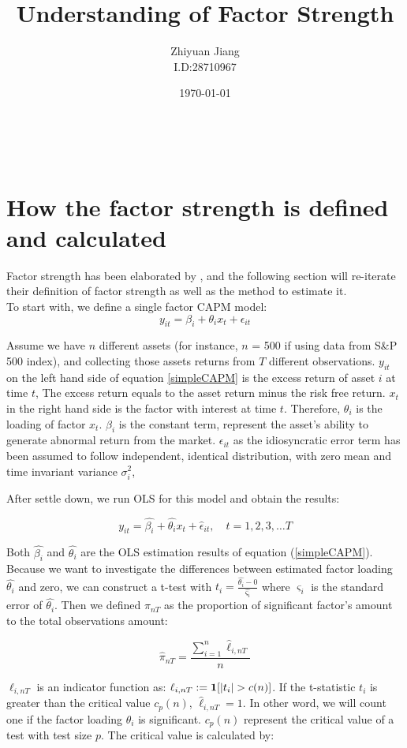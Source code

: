 \documentclass[12pt]{article}
\title{Understanding of Factor Strength}
\author{Zhiyuan Jiang\\I.D:28710967}
\date{\today}
\begin{document}
	\maketitle	
\
	\section*{How the factor strength is defined and calculated }
Factor strength has been elaborated by , and the following section will re-iterate their definition of factor strength as well as the method to estimate it.\\
To start with, we define a single factor CAPM model:
\[  y_{it} = \beta_i + \theta_{i}x_t + \epsilon_{it}  \tag{1}\label{simpleCAPM} \]

Assume we have $n$ different assets (for instance, $n$ = 500 if using data from S\&P 500 index), and collecting those assets returns from $T$ different observations. $y_{it}$ on the left hand side of equation \ref{simpleCAPM} is the excess return of asset $i$ at time $t$, The excess return equals to the asset return minus the risk free return. $x_t$  in the right hand side is the factor with interest at time $t$. Therefore, $\theta_{i}$ is the loading of factor $x_{t}$. $\beta_{i}$ is the constant term, represent the asset's ability to generate abnormal return from the market. $\epsilon_{it}$ as the idiosyncratic error term has been assumed to follow independent, identical distribution, with zero mean and time invariant variance  $\sigma_i^2$,


After settle down, we run OLS for this model and obtain the results:

\[ y_{it} =\hat{\beta_i} + \hat{\theta_{i}}x_t + \hat{\epsilon}_{it}, \quad t = 1, 2, 3, \dots  T     \]

Both $\hat{\beta_i}$ and $\hat{\theta_{i}}$ are the OLS estimation results of equation  (\ref{simpleCAPM}). Because we want to investigate the differences between estimated factor loading $\hat{\theta_{i}}$ and zero, we can construct a t-test with $t_{i} = \frac{\hat{\theta_{i}} - 0}{\hat{\varsigma_{i}}}$ where $\varsigma_{i}$ is the standard error of $\hat{\theta_{i}}$.  Then we defined $\pi_{nT}$ as the proportion of significant factor's amount to the total observations amount:

\[  \hat{\pi}_{nT} = \frac{\sum_{i=1}^n \hat{\ell}_{i,nT}}{n} \tag{2} \label{pi_function} \]

$\ell_{i,nT}$ is an indicator function as: $\ell_{i,nT} := {\bf1}[|t_{i}|>c(n)]$. If the t-statistic $t_i$ is greater than the critical value $c_p(n)$, $\hat{\ell}_{i,nT} = 1$. In other word, we will count one if the factor loading $\hat{\theta}_{i}$ is significant. $c_p(n)$ represent the critical value of a test with test size $p$. The critical value is calculated by:
\end{document}
